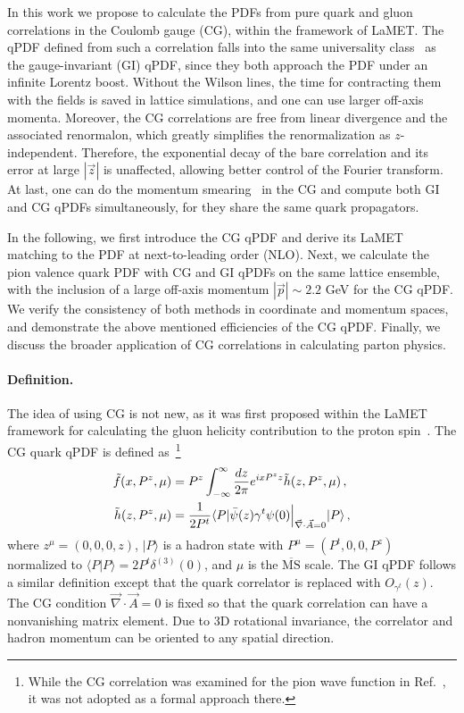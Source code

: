 \documentclass[prd,twocolumn,preprintnumbers,showpacs,nofootinbib,superscriptaddress,notitlepage,floatfix]{revtex4-1}
\newcommand{\MS}{{\overline{\mathrm{MS}}}}
\begin{document}
In this work we propose to calculate the PDFs from pure quark and gluon correlations in the Coulomb gauge (CG), within the framework of LaMET. The qPDF defined from such a correlation falls into the same universality class~\cite{Hatta:2013gta,Ji:2020ect} as the gauge-invariant (GI) qPDF, since they both approach the PDF under an infinite Lorentz boost. 
Without the Wilson lines, the time for contracting them with the fields is saved in lattice simulations, and one can use larger off-axis momenta. Moreover, the CG correlations are free from linear divergence and the associated renormalon, which greatly simplifies the renormalization as $z$-independent. Therefore, the exponential decay of the bare correlation and its error at large $|\vec{z}|$ is unaffected, allowing better control of the Fourier transform. At last, one can do the momentum smearing~\cite{Izubuchi:2019lyk,Gao:2020ito} in the CG and compute both GI and CG qPDFs simultaneously, for they share the same quark propagators.

In the following, we first introduce the CG qPDF and derive its LaMET matching to the PDF at next-to-leading order (NLO). Next, we calculate the pion valence quark PDF with CG and GI qPDFs on the same lattice ensemble, with the inclusion of a large off-axis momentum $|\vec{p}|\sim2.2$ GeV for the CG qPDF. 
We verify the consistency of both methods in coordinate and momentum spaces, and demonstrate the above mentioned efficiencies of the CG qPDF. 
Finally, we discuss the broader application of CG correlations in calculating parton physics.

\paragraph*{Definition.} The idea of using CG is not new, as it was first proposed within the LaMET framework for calculating the gluon helicity contribution to the proton spin~\cite{Ji:2013fga,Hatta:2013gta,Ji:2014lra,Yang:2016plb}.
The CG quark qPDF is defined as~\footnote{While the CG correlation was examined for the pion wave function in Ref.~\cite{Gupta:1993vp}, it was not adopted as a formal approach there.}
\begin{align}
    \tilde f(x,P^z,\mu) &= P^z\int_{-\infty}^\infty \frac{dz}{2\pi} e^{i x P^z z} \tilde h(z,P^z,\mu)\,,\\
    \tilde h(z,P^z,\mu) &= {1\over 2P^t}\langle P| \bar{\psi}(z)\gamma^t \psi(0)\Big|_{\vec{\nabla}\cdot \vec{A}=0}|P\rangle\,,
\end{align}
where $z^\mu=(0,0,0,z)$, $|P\rangle$ is a hadron state with $P^\mu=(P^t,0,0,P^z)$ normalized to $\langle P|P\rangle = 2P^t\delta^{(3)}(0)$, and $\mu$ is the $\MS$ scale. The GI qPDF follows a similar definition except that the quark correlator is replaced with $O_{\gamma^t}(z)$. The CG condition $\vec{\nabla}\cdot \vec{A}=0$ is fixed so that the quark correlation can have a nonvanishing matrix element. Due to 3D rotational invariance, the correlator and hadron momentum can be oriented to any spatial direction.
\end{document}
